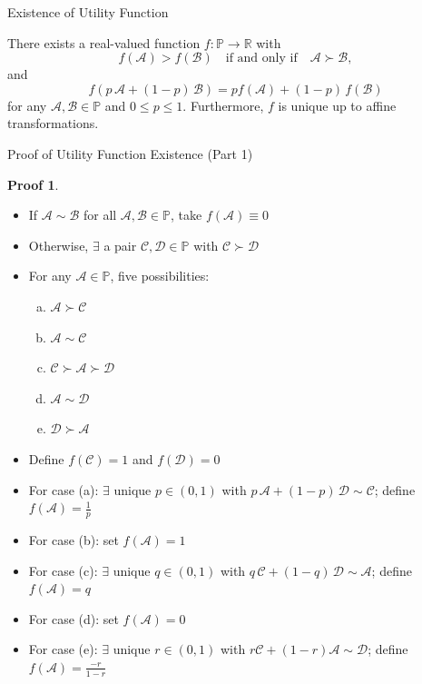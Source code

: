 \documentclass[10pt]{beamer}
\newcommand{\ds}{\displaystyle}
\theoremstyle{definition}
\newtheorem*{prf}{Proof}
\begin{document}
\begin{frame}{Existence of Utility Function}
  \begin{theorem}
    There exists a real-valued function $f : \mathbb{P} \to \mathbb{R}$ with
    \[f(\mathcal{A}) > f(\mathcal{B}) \quad \text{if and only if} \quad \mathcal{A} \succ \mathcal{B},\]
    and
    \[f(p\,\mathcal{A} + (1-p)\,\mathcal{B}) = pf(\mathcal{A}) + (1-p)\,f(\mathcal{B})\]
    for any $\mathcal{A}, \mathcal{B} \in \mathbb{P}$ and $0 \leqslant p \leqslant 1$. Furthermore, $f$ is unique up to affine transformations.
  \end{theorem}
\end{frame}

\begin{frame}{Proof of Utility Function Existence (Part 1)}
  \begin{prf}
    \begin{itemize}[<+->]
      \item If $\mathcal{A} \sim \mathcal{B}$ for all $\mathcal{A}, \mathcal{B} \in \mathbb{P}$, take $f(\mathcal{A}) \equiv 0$
      \item Otherwise, $\exists$ a pair $\mathcal{C}, \mathcal{D} \in \mathbb{P}$ with $\mathcal{C} \succ \mathcal{D}$
      \item For any $\mathcal{A} \in \mathbb{P}$, five possibilities:
        \vspace{-3mm}
        \begin{multicols}{3}
        \begin{enumerate}[(a)]
          \item $\mathcal{A} \succ \mathcal{C}$
          \item $\mathcal{A} \sim \mathcal{C}$
          \item $\mathcal{C} \succ \mathcal{A} \succ \mathcal{D}$
          \item $\mathcal{A} \sim \mathcal{D}$
          \item $\mathcal{D} \succ \mathcal{A}$
        \end{enumerate}
      \end{multicols}
      \vspace{-3mm}
      \item Define $f(\mathcal{C}) = 1$ and $f(\mathcal{D}) = 0$
      \item For case (a): $\exists$ unique $p \in (0, 1)$ with $p\,\mathcal{A} + (1-p)\,\mathcal{D} \sim \mathcal{C}$; define $\ds f(\mathcal{A}) = \frac{1}{p}$
      \item For case (b): set $f(\mathcal{A}) = 1$
      \item For case (c): $\exists$ unique $q \in (0, 1)$ with $q\,\mathcal{C} + (1-q)\,\mathcal{D} \sim \mathcal{A}$; define $f(\mathcal{A}) = q$
      \item For case (d): set $f(\mathcal{A}) = 0$
      \item For case (e): $\exists$ unique $r \in (0, 1)$ with $r\mathcal{C} + (1-r)\mathcal{A} \sim \mathcal{D}$; define $\ds f(\mathcal{A}) = \frac{-r}{1-r}$
    \end{itemize}
  \end{prf}
\end{frame}
\end{document}
